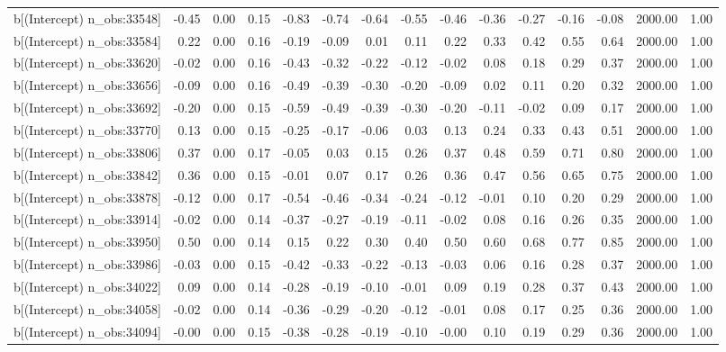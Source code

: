 \begin{table}[ht]
\begin{tabular}{rrrrrrrrrrrrrrr}
  b[(Intercept) n\_obs:33548] & -0.45 & 0.00 & 0.15 & -0.83 & -0.74 & -0.64 & -0.55 & -0.46 & -0.36 & -0.27 & -0.16 & -0.08 & 2000.00 & 1.00 \\ 
  b[(Intercept) n\_obs:33584] & 0.22 & 0.00 & 0.16 & -0.19 & -0.09 & 0.01 & 0.11 & 0.22 & 0.33 & 0.42 & 0.55 & 0.64 & 2000.00 & 1.00 \\ 
  b[(Intercept) n\_obs:33620] & -0.02 & 0.00 & 0.16 & -0.43 & -0.32 & -0.22 & -0.12 & -0.02 & 0.08 & 0.18 & 0.29 & 0.37 & 2000.00 & 1.00 \\ 
  b[(Intercept) n\_obs:33656] & -0.09 & 0.00 & 0.16 & -0.49 & -0.39 & -0.30 & -0.20 & -0.09 & 0.02 & 0.11 & 0.20 & 0.32 & 2000.00 & 1.00 \\ 
  b[(Intercept) n\_obs:33692] & -0.20 & 0.00 & 0.15 & -0.59 & -0.49 & -0.39 & -0.30 & -0.20 & -0.11 & -0.02 & 0.09 & 0.17 & 2000.00 & 1.00 \\ 
  b[(Intercept) n\_obs:33770] & 0.13 & 0.00 & 0.15 & -0.25 & -0.17 & -0.06 & 0.03 & 0.13 & 0.24 & 0.33 & 0.43 & 0.51 & 2000.00 & 1.00 \\ 
  b[(Intercept) n\_obs:33806] & 0.37 & 0.00 & 0.17 & -0.05 & 0.03 & 0.15 & 0.26 & 0.37 & 0.48 & 0.59 & 0.71 & 0.80 & 2000.00 & 1.00 \\ 
  b[(Intercept) n\_obs:33842] & 0.36 & 0.00 & 0.15 & -0.01 & 0.07 & 0.17 & 0.26 & 0.36 & 0.47 & 0.56 & 0.65 & 0.75 & 2000.00 & 1.00 \\ 
  b[(Intercept) n\_obs:33878] & -0.12 & 0.00 & 0.17 & -0.54 & -0.46 & -0.34 & -0.24 & -0.12 & -0.01 & 0.10 & 0.20 & 0.29 & 2000.00 & 1.00 \\ 
  b[(Intercept) n\_obs:33914] & -0.02 & 0.00 & 0.14 & -0.37 & -0.27 & -0.19 & -0.11 & -0.02 & 0.08 & 0.16 & 0.26 & 0.35 & 2000.00 & 1.00 \\ 
  b[(Intercept) n\_obs:33950] & 0.50 & 0.00 & 0.14 & 0.15 & 0.22 & 0.30 & 0.40 & 0.50 & 0.60 & 0.68 & 0.77 & 0.85 & 2000.00 & 1.00 \\ 
  b[(Intercept) n\_obs:33986] & -0.03 & 0.00 & 0.15 & -0.42 & -0.33 & -0.22 & -0.13 & -0.03 & 0.06 & 0.16 & 0.28 & 0.37 & 2000.00 & 1.00 \\ 
  b[(Intercept) n\_obs:34022] & 0.09 & 0.00 & 0.14 & -0.28 & -0.19 & -0.10 & -0.01 & 0.09 & 0.19 & 0.28 & 0.37 & 0.43 & 2000.00 & 1.00 \\ 
  b[(Intercept) n\_obs:34058] & -0.02 & 0.00 & 0.14 & -0.36 & -0.29 & -0.20 & -0.12 & -0.01 & 0.08 & 0.17 & 0.25 & 0.36 & 2000.00 & 1.00 \\ 
  b[(Intercept) n\_obs:34094] & -0.00 & 0.00 & 0.15 & -0.38 & -0.28 & -0.19 & -0.10 & -0.00 & 0.10 & 0.19 & 0.29 & 0.36 & 2000.00 & 1.00 \\ 

\end{tabular}
\end{table}
